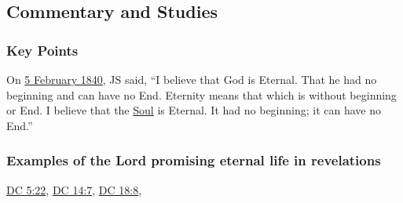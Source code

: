 	
	
\subsection{Commentary and Studies} %
	\label{ETERNITY-COMMENTARY}

	\subsubsection{Key Points}
		\label{ETERNITY-KEYS}
	
		\begin{compactitem}
			\item On \hyperref[EMS-1840-JS-5-FEB-1840]{5 February 1840}, JS said, ``I believe that God is Eternal. That he had no beginning and can have no End. Eternity means that which is without beginning or End. I believe that the \uline{Soul} is Eternal. It had no beginning; it can have no End.''
		\end{compactitem}
		
	\subsubsection{Examples of the Lord promising eternal life in revelations}
		\label{ETERNITY-promise}
		
			\hyperref[DC5-22]{DC 5:22}, \hyperref[DC14-7]{DC 14:7}, \hyperref[DC18-8]{DC 18:8}, 